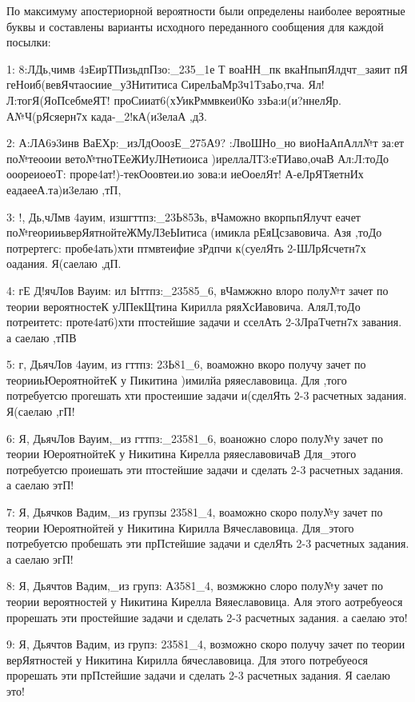 По максимуму апостериорной вероятности были определены наиболее вероятные буквы и составлены варианты исходного переданного сообщения для каждой посылки:

\vspace{0.5cm}

{ \scriptsize
1: 8:ЛДь,чимв 4зЕирТПизьдпПзо:\_235\_1е Т воаНН\_пк вкаНпыпЯлдчт\_заяит пЯ геНоиб(вевЯчтаосиие\_уЗНититиса СирелЬаМр3ч1ТзаЬо,тча. Ял!Л:тогЯ(ЯоПсебмеЯТ! проСииат6(хУикРммвкеи0Ко ззЬа:и(и?ннелЯр. А№Ч(рЯсяерн7х када-\_2!кА(и3елаА ,дЗ.

2: А:ЛА6э3инв ВаЕХр:\_изЛдОоозЕ\_275А9? :ЛвоШНо\_но виоНаАпАлл№т за:ет по№теооии вето№тноТЕеЖИуЛНетиоиса )иреллаЛТ3:еТИаво,очаВ Ал:Л:тоДо ооореиоеоТ: проре4ат!)-текОоовтеи.ио зова:и иеОоелЯт! А-еЛрЯТяетнИх еадаееА.та)и3елаю ,тП,

3: !, Дь,чЛмв 4ауим, изшгттпз:\_23Ь85Зь, вЧаможно вкорпьпЯлучт еачет по№георииьверЯятнойтеЖМуЛЗеЫитиса (имикла рЕяЦсзавовича. Азя ,тоДо потрертегс: пробе4ать)хти птмвтеифие зРдпчи к(суелЯть 2-ШЛрЯсчетн7х оадания. Я(саелаю ,дП.

4: гЕ Д!ячЛов Вауим: ил Ыттпз:\_23585\_6, вЧамжжно влоро полу№т зачет по теории вероятностеК уЛПекЩтина Кирилла ряяХсИавовича. АляЛ,тоДо потреитетс: проте4ат6)хти птостейшие задачи и сселАть 2-3ЛраТчетн7х завания. а саелаю ,тПВ

5: г, ДьячЛов 4ауим, из гттпз: 23Ь81\_6, воаможно вкоро получу зачет по теорииьЮероятнойтеК у Пикитина )имилйа ряяеславовица. Для ,того потребуетсю прогешать хти простеишие задачи и(сделЯть 2-3 расчетных задания. Я(саелаю ,гП!

6: Я, ДьячЛов Вауим,\_из гттпз:\_23581\_6, воаножно слоро полу№у зачет по теории ЮероятнойтеК у Никитина Кирелла ряяеславовичаВ Для\_этого потребуетсю проиешать эти птостейшие задачи и сделать 2-3 расчетных задания. а саелаю этП!

7: Я, Дьячков Вадим,\_из групзы 23581\_4, воаможно скоро полу№у зачет по теории Юероятнойтей у Никитина Кирилла Вячеславовица. Для\_этого потребуетсю пробешать эти прПстейшие задачи и сделЯть 2-3 расчетных задания. а саелаю эгП!

8: Я, Дьячтов Вадим,\_из групз: А3581\_4, возмжжно слоро полу№у зачет по теории вероятностей у Никитина Кирелла Вяяеславовица. Аля этого аотребуеося прорешать эти простейшие задачи и сделать 2-3 расчетных задания. а саелаю это!

9: Я, Дьячтов Вадим, из групз: 23581\_4, возможно скоро получу зачет по теории верЯятностей у Никитина Кирилла бячеславовица. Для этого потребуеося прорешать эти прПстейшие задачи и сделать 2-3 расчетных задания. Я саелаю это!

}
